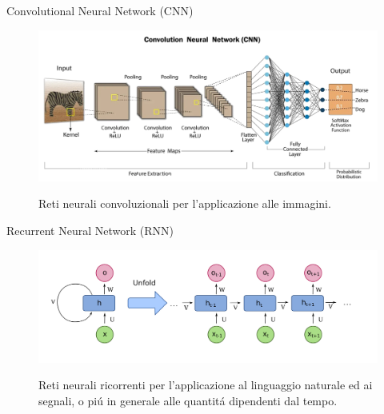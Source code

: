 \documentclass[aspectratio=169]{beamer}
\begin{document}
\begin{frame}{Convolutional Neural Network (CNN)}
    \begin{figure}
        \begin{minipage}{0.7\textwidth}
            \centering
            \includegraphics[width=\textwidth]{architectures/CNN.png}
        \end{minipage}%
        \begin{minipage}{0.3\textwidth}
            \centering
            Reti neurali convoluzionali per l'applicazione alle immagini.
        \end{minipage}
    \end{figure}
\end{frame}

\begin{frame}{Recurrent Neural Network (RNN)}
    \begin{figure}
        \begin{minipage}{0.7\textwidth}
            \centering
            \includegraphics[width=\textwidth]{architectures/RNN.png}
        \end{minipage}%
        \begin{minipage}{0.3\textwidth}
            \centering
            Reti neurali ricorrenti per l'applicazione al linguaggio naturale ed ai segnali, o pi\'u in generale alle quantit\'a dipendenti dal tempo.
        \end{minipage}
    \end{figure}
\end{frame}
\end{document}
